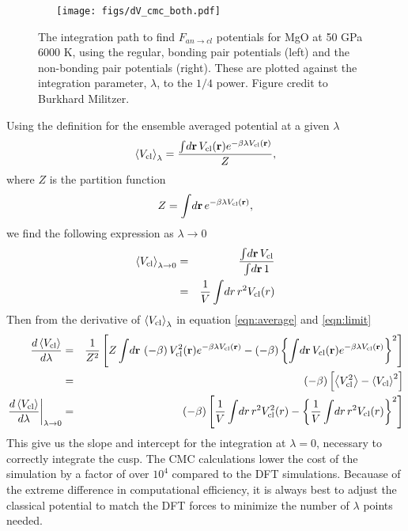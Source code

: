 \begin{figure}[h!]  
  \centering
  \texttt{[image: figs/dV\_cmc\_both.pdf]}
\caption{The integration path to find $F_{an \to cl}$ potentials for MgO at 50 GPa 6000
K, using the regular, bonding pair potentials (left) and
the non-bonding pair potentials (right). These are plotted against the
integration parameter, $\lambda$, to the $1/4$ power. Figure credit to Burkhard
Militzer. }
\label{fig:integrate_cmc}
\end{figure}

Using the definition for the ensemble averaged potential at a given
$\lambda$
\begin{eqnarray}
  \left< V_{\rm cl} \right>_{\lambda} = \frac{ \int \! d{\bf r} \, V_{\rm cl}({\bf r}) 
  e^{ -\beta \lambda V_{\rm cl}({\bf r}) } }
  { Z}, \label{eqn:average}
\end{eqnarray}
where $Z$ is the partition function
\begin{eqnarray}
Z =  \int \! d{\bf r} \, e^{ -\beta \lambda V_{\rm cl}({\bf r}) },
\end{eqnarray}
we find the following expression as $\lambda \to 0$
\begin{eqnarray}
 \left< V_{\rm cl} \right>_{\lambda \to 0} &=& \frac{ \int \! d{\bf r} \, V_{\rm
 cl}}
 {  \int \! d{\bf r} \, 1} \nonumber \\
 &=& \frac{1}{V}  \int \! dr \, r^2 V_{\rm cl}(r) \label{eqn:limit}
\end{eqnarray}
Then from the derivative of $\left< V_{\rm cl} \right>_{\lambda}$ in
equation \ref{eqn:average} and \ref{eqn:limit}
\begin{eqnarray}
  \frac{d \left< V_{\rm cl} \right>}{d \lambda}
   &=& \frac{1}{Z^2} 
  \left[ Z \int \! d{\bf r} \, \left(-\beta \right)V_{\rm cl}^2({\bf r}) 
    e^{ -\beta \lambda V_{\rm cl}({\bf r}) } 
   - \left(-\beta \right)\left\{  \int \! d{\bf r} \, V_{\rm cl}({\bf r}) e^{ -\beta \lambda
     V_{\rm cl}({\bf r}) } \right\}^2
    \right] \nonumber \\
   &=& (-\beta) \left[ \left< V_{\rm cl}^2 \right> - \left< V_{\rm
   cl}\right>^2 \right] \nonumber \\
   \left. \frac{d \left< V_{\rm cl} \right>}{d \lambda}\right|_{\lambda \to 0} 
   &=& (-\beta) \left[  \frac{1}{V}  \int \! dr \, r^2 V^2_{\rm cl}(r) -
     \left\{ \frac{1}{V}  \int \! dr \, r^2 V_{\rm cl}(r) \right\}^2 \right]
  \end{eqnarray}
This give us the slope and intercept for the integration at $\lambda=0$, necessary to
correctly integrate the cusp. The CMC calculations lower the cost of the simulation
by a factor of over $10^4$ compared to the DFT simulations. Becauase of the extreme
difference in computational efficiency, it is always best to adjust the classical
potential to match the DFT forces to minimize the number of $\lambda$ points needed.


